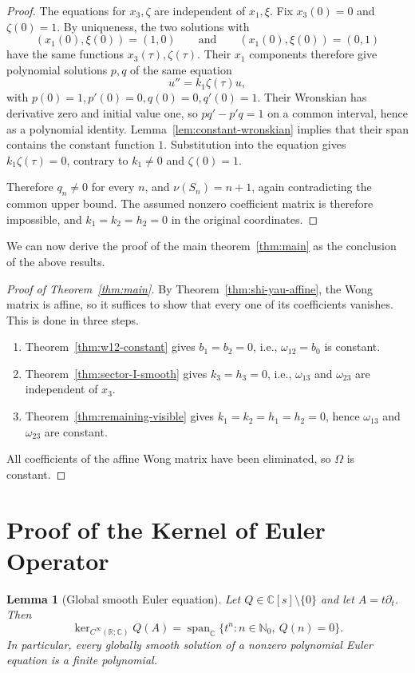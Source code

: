 \documentclass{tCON2e}
\newenvironment{revision}{\begingroup\color{black}}{\endgroup}
\numberwithin{equation}{section}
\theoremstyle{journalplain}
\newtheorem{lemma}[theorem]{Lemma}
\theoremstyle{journaldef}
\newenvironment{revision}{}{}
\begin{document}
\begin{revision}
\begin{proof}
The equations for $x_3,\zeta$ are independent of $x_1,\xi$.
Fix $x_3(0)=0$ and $\zeta(0)=1$.
By uniqueness, the two solutions with
\[
(x_1(0),\xi(0))=(1,0)
\qquad\text{and}\qquad
(x_1(0),\xi(0))=(0,1)
\]
have the same functions $x_3(\tau),\zeta(\tau)$.
Their $x_1$ components therefore give polynomial solutions
$p,q$ of the same equation
\[
u''=k_1\zeta(\tau)u,
\]
with
\(
p(0)=1,p'(0)=0,
q(0)=0,q'(0)=1.
\)
Their Wronskian has derivative zero and initial value one,
so $pq'-p'q=1$ on a common interval, hence as a polynomial
identity. Lemma~\ref{lem:constant-wronskian} implies that
their span contains the constant function $1$.
Substitution into the equation gives $k_1\zeta(\tau)=0$,
contrary to $k_1\ne0$ and $\zeta(0)=1$.

Therefore $q_n\ne0$ for every $n$, and
$\nu(S_n)=n+1$, again contradicting the common upper bound.
The assumed nonzero coefficient matrix is therefore impossible,
and $k_1=k_2=h_2=0$ in the original coordinates.
\end{proof}

We can now derive the proof of the main theorem~\ref{thm:main} as the conclusion of the above results.
\begin{proof}[Proof of Theorem~\ref{thm:main}]
By Theorem~\ref{thm:shi-yau-affine}, the Wong matrix is affine, so it
suffices to show that every one of its coefficients vanishes. This is
done in three steps.
\begin{enumerate}
    \item Theorem~\ref{thm:w12-constant} gives $b_1=b_2=0$, i.e., $\omega_{12}=b_0$ is constant.
    \item Theorem~\ref{thm:sector-I-smooth} gives $k_3=h_3=0$, i.e., $\omega_{13}$ and $\omega_{23}$ are independent of $x_3$.
    \item Theorem~\ref{thm:remaining-visible} gives $k_1=k_2=h_1 =h_2=0$, hence $\omega_{13}$ and $\omega_{23}$ are constant.
\end{enumerate}
All coefficients of the affine Wong matrix have been eliminated, so
$\Omega$ is constant.
\end{proof}




\appendix
\section{Proof of the Kernel of Euler Operator}\label{app:euler}
\begin{lemma}[Global smooth Euler equation]\label{lem:global-smooth-euler}
Let $Q\in\mathbb C[s]\setminus\{0\}$ and let $A=t\partial_t$. Then
\[
 \ker_{C^\infty(\mathbb R;\mathbb C)}Q(A)
 =\operatorname{span}_{\mathbb C}
   \{t^n:n\in\mathbb N_0,\ Q(n)=0\}.
\]
In particular, every globally smooth solution of a nonzero polynomial Euler equation is a
finite polynomial.
\end{lemma}


\end{revision}
\end{document}
